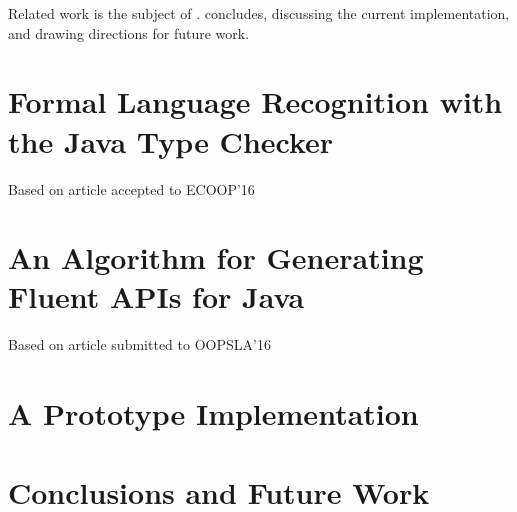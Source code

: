\documentclass[12pt]{book}
\begin{document}
Related work is the subject of .
concludes, discussing the current implementation, and drawing
directions for future
work.

\chapter{Formal Language Recognition with the Java Type Checker}
\Large{Based on article accepted to ECOOP'16~\protect\cite{Gil:Levy:2016}}
\label{chapter:ecoop}


\chapter{An Algorithm for Generating Fluent APIs for Java}
\Large{Based on article submitted to OOPSLA'16~\cite{Gil:Levy:2016a}}
\label{chapter:oopsla}


\chapter{A Prototype Implementation}
\label{chapter:tokens}
%

\chapter{Conclusions and Future Work}
\label{chapter:conclusions}





\end{document}
